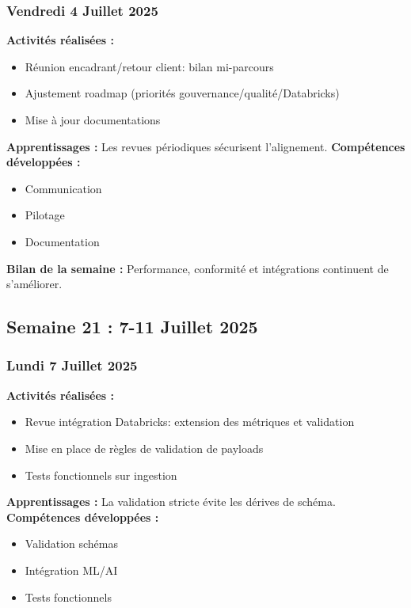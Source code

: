 \documentclass[12pt,a4paper]{article}
\begin{document}
\subsubsection{Vendredi 4 Juillet 2025}
\textbf{Activités réalisées :}
\begin{itemize}
    \item Réunion encadrant/retour client: bilan mi-parcours
    \item Ajustement roadmap (priorités gouvernance/qualité/Databricks)
    \item Mise à jour documentations
\end{itemize}
\textbf{Apprentissages :} Les revues périodiques sécurisent l'alignement.
\textbf{Compétences développées :}
\begin{itemize}
    \item Communication
    \item Pilotage
    \item Documentation
\end{itemize}
\textbf{Bilan de la semaine :} Performance, conformité et intégrations continuent de s'améliorer.

\clearpage
\subsection{Semaine 21 : 7-11 Juillet 2025}

\subsubsection{Lundi 7 Juillet 2025}
\textbf{Activités réalisées :}
\begin{itemize}
    \item Revue intégration Databricks: extension des métriques et validation
    \item Mise en place de règles de validation de payloads
    \item Tests fonctionnels sur ingestion
\end{itemize}
\textbf{Apprentissages :} La validation stricte évite les dérives de schéma.
\textbf{Compétences développées :}
\begin{itemize}
    \item Validation schémas
    \item Intégration ML/AI
    \item Tests fonctionnels
\end{itemize}
\end{document}
